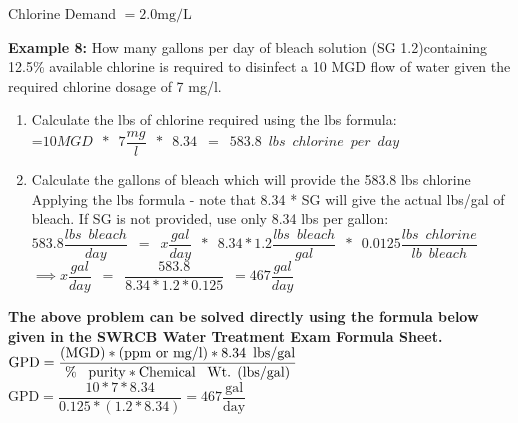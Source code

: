 Chlorine Demand $=2.0 \mathrm{mg} / \mathrm{L}$

\textbf{Example 8:} How many gallons per day of bleach solution (SG 1.2)containing 12.5\% available chlorine is required to disinfect a 10 MGD flow of water given the required chlorine dosage of 7 mg/l.\\
\begin{enumerate}
\item Calculate the lbs of chlorine required using the lbs formula:\\
\vspace{0.5cm}
=$10 MGD \enspace * \enspace 7 \dfrac{mg}{l} \enspace * \enspace 8.34\enspace=\enspace 583.8 \enspace lbs \enspace chlorine \enspace per \enspace day$\\
\vspace{0.5cm}
\item Calculate the gallons of bleach which will provide the 583.8 lbs chlorine\\
\vspace{0.5cm}
Applying the lbs formula - note that 8.34 * SG will give the actual lbs/gal of bleach.  If SG is not provided, use only 8.34 lbs per gallon:\\
\vspace{0.5cm}
$583.8 \dfrac{lbs \enspace bleach}{day}\enspace=\enspace x \dfrac{gal}{day} \enspace * \enspace 8.34 * 1.2 \dfrac{lbs \enspace bleach}{gal} \enspace * \enspace 0.0125 \dfrac{lbs \enspace chlorine}{lb \enspace bleach} \enspace $\\
\vspace{0.5cm}
$ \implies x \dfrac{gal}{day}\enspace = \enspace \dfrac{583.8}{8.34*1.2*0.125} \enspace = \boxed{467 \dfrac{gal}{day}}$
\end{enumerate}
\vspace{0.3cm}
\textbf{The above problem can be solved directly using the formula below given in the SWRCB Water Treatment Exam Formula Sheet.}\\
\vspace{0.3cm}
 $\textrm{GPD}=\dfrac{\textrm{(MGD)}*\textrm{(ppm or mg/l)}*8.34 \enspace \textrm{lbs/gal}}{\textrm{\% \enspace purity}*\textrm{Chemical \enspace Wt. (lbs/gal)}}$ 
 \vspace{0.3cm}
 $\textrm{GPD}=\dfrac{10*7*8.34}{0.125*(1.2*8.34)}=\boxed{467 \dfrac{\textrm{gal}}{\textrm{day}}}$ 


